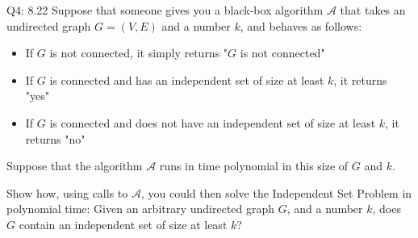 \begin{problem}
  {Q4: 8.22}
  Suppose that someone gives you a black-box algorithm $\mathcal{A}$ that takes an undirected graph $G = (V,E)$ and a number $k$, and behaves as
  follows:
  \begin{itemize}
      \item If $G$ is not connected, it simply returns "$G$ is not connected"
      \item If $G$ is connected and has an independent set of size at least $k$, it returns "yes"
      \item If $G$ is connected and does not have an independent set of size at least $k$, it returns "no"
  \end{itemize}
  Suppose that the algorithm $\mathcal{A}$ runs in time polynomial in this size of $G$ and $k$.

  Show how, using calls to $\mathcal{A}$, you could then solve the Independent Set Problem in polynomial time: Given an arbitrary undirected
  graph $G$, and a number $k$, does $G$ contain an independent set of size at least $k$?
\end{problem}
